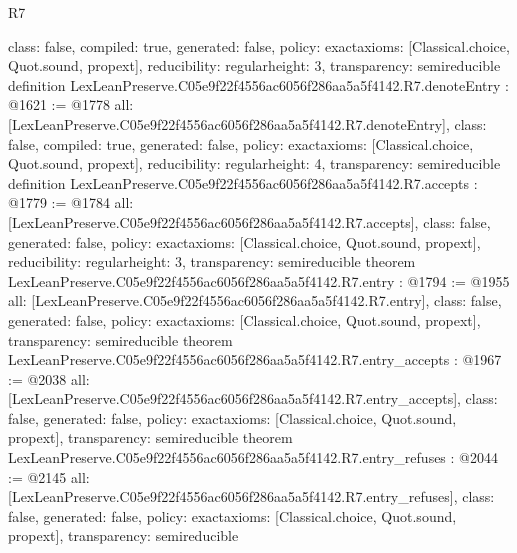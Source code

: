 \begin{lexlean}{R7}
\begin{coremodule}
{  class: false,
  compiled: true,
  generated: false,
  policy: exact{axioms: [Classical.choice, Quot.sound, propext]},
  reducibility: regular{height: 3},
  transparency: semireducible
}
definition LexLeanPreserve.C05e9f22f4556ac6056f286aa5a5f4142.R7.denoteEntry : @1621 := @1778 {
  all: [LexLeanPreserve.C05e9f22f4556ac6056f286aa5a5f4142.R7.denoteEntry],
  class: false,
  compiled: true,
  generated: false,
  policy: exact{axioms: [Classical.choice, Quot.sound, propext]},
  reducibility: regular{height: 4},
  transparency: semireducible
}
definition LexLeanPreserve.C05e9f22f4556ac6056f286aa5a5f4142.R7.accepts : @1779 := @1784 {
  all: [LexLeanPreserve.C05e9f22f4556ac6056f286aa5a5f4142.R7.accepts],
  class: false,
  generated: false,
  policy: exact{axioms: [Classical.choice, Quot.sound, propext]},
  reducibility: regular{height: 3},
  transparency: semireducible
}
theorem LexLeanPreserve.C05e9f22f4556ac6056f286aa5a5f4142.R7.entry : @1794 := @1955 {
  all: [LexLeanPreserve.C05e9f22f4556ac6056f286aa5a5f4142.R7.entry],
  class: false,
  generated: false,
  policy: exact{axioms: [Classical.choice, Quot.sound, propext]},
  transparency: semireducible
}
theorem LexLeanPreserve.C05e9f22f4556ac6056f286aa5a5f4142.R7.entry_accepts : @1967 := @2038 {
  all: [LexLeanPreserve.C05e9f22f4556ac6056f286aa5a5f4142.R7.entry_accepts],
  class: false,
  generated: false,
  policy: exact{axioms: [Classical.choice, Quot.sound, propext]},
  transparency: semireducible
}
theorem LexLeanPreserve.C05e9f22f4556ac6056f286aa5a5f4142.R7.entry_refuses : @2044 := @2145 {
  all: [LexLeanPreserve.C05e9f22f4556ac6056f286aa5a5f4142.R7.entry_refuses],
  class: false,
  generated: false,
  policy: exact{axioms: [Classical.choice, Quot.sound, propext]},
  transparency: semireducible
}


\end{coremodule}
\end{lexlean}
